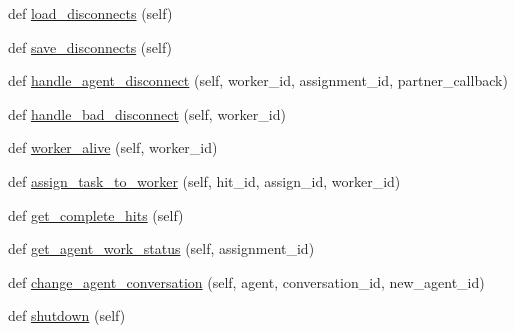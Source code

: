 \begin{DoxyCompactItemize}
\item 
def \hyperlink{classparlai_1_1mturk_1_1core_1_1legacy__2018_1_1worker__manager_1_1WorkerManager_a1c70337b6be1f18d18fc3b7e3e88c74a}{load\+\_\+disconnects} (self)
\item 
def \hyperlink{classparlai_1_1mturk_1_1core_1_1legacy__2018_1_1worker__manager_1_1WorkerManager_ae37565b2ca25dfa147f7c535551d9b88}{save\+\_\+disconnects} (self)
\item 
def \hyperlink{classparlai_1_1mturk_1_1core_1_1legacy__2018_1_1worker__manager_1_1WorkerManager_a79f7899bc0a506c8c22838a522b1707c}{handle\+\_\+agent\+\_\+disconnect} (self, worker\+\_\+id, assignment\+\_\+id, partner\+\_\+callback)
\item 
def \hyperlink{classparlai_1_1mturk_1_1core_1_1legacy__2018_1_1worker__manager_1_1WorkerManager_adf464b2fc2ae8ab451ad74c71dc6eab9}{handle\+\_\+bad\+\_\+disconnect} (self, worker\+\_\+id)
\item 
def \hyperlink{classparlai_1_1mturk_1_1core_1_1legacy__2018_1_1worker__manager_1_1WorkerManager_afb91363ee33ddd874d9afc558a900a91}{worker\+\_\+alive} (self, worker\+\_\+id)
\item 
def \hyperlink{classparlai_1_1mturk_1_1core_1_1legacy__2018_1_1worker__manager_1_1WorkerManager_a689523f2d1b7f0b9050feba065078081}{assign\+\_\+task\+\_\+to\+\_\+worker} (self, hit\+\_\+id, assign\+\_\+id, worker\+\_\+id)
\item 
def \hyperlink{classparlai_1_1mturk_1_1core_1_1legacy__2018_1_1worker__manager_1_1WorkerManager_a9847c09d96df8f5b9be39715196f67ba}{get\+\_\+complete\+\_\+hits} (self)
\item 
def \hyperlink{classparlai_1_1mturk_1_1core_1_1legacy__2018_1_1worker__manager_1_1WorkerManager_af760454741dd152b5cf325cbdaff4d3f}{get\+\_\+agent\+\_\+work\+\_\+status} (self, assignment\+\_\+id)
\item 
def \hyperlink{classparlai_1_1mturk_1_1core_1_1legacy__2018_1_1worker__manager_1_1WorkerManager_a4d4ad9272228cdf5f124ef79d812d5f6}{change\+\_\+agent\+\_\+conversation} (self, agent, conversation\+\_\+id, new\+\_\+agent\+\_\+id)
\item 
def \hyperlink{classparlai_1_1mturk_1_1core_1_1legacy__2018_1_1worker__manager_1_1WorkerManager_a49e820a0aa2eb8a320f32126b279ca10}{shutdown} (self)
\end{DoxyCompactItemize}
